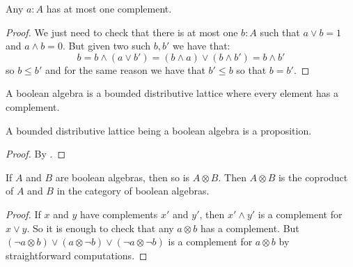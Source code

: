 \begin{lemma}\label{complement-unique}
Any $a:A$ has at most one complement.
\end{lemma}

\begin{proof}
We just need to check that there is at most one $b:A$ such that $a\lor b=1$ and $a\land b = 0$. But given two such $b,b'$ we have that:
\[b = b\land (a\lor b') = (b\land a) \lor (b\land b') = b\land b'\]
so $b\leq b'$ and for the same reason we have that $b'\leq b$ so that $b=b'$.
\end{proof}

\begin{definition}
A boolean algebra is a bounded distributive lattice where every element has a complement.
\end{definition}

\begin{lemma}\label{being-boolean-proposition}
A bounded distributive lattice being a boolean algebra is a proposition.
\end{lemma}

\begin{proof}
By .
\end{proof}

\begin{lemma}
If $A$ and $B$ are boolean algebras, then so is $A\otimes B$. Then $A\otimes B$ is the coproduct of $A$ and $B$ in the category of boolean algebras.
\end{lemma}

\begin{proof}
If $x$ and $y$ have complements $x'$ and $y'$, then $x'\land y'$ is a complement for $x\lor y$. So it is enough to check that any $a\otimes b$ has a complement. But $(\neg a\otimes b) \lor (a\otimes \neg b) \lor (\neg a\otimes \neg b)$ is a complement for $a\otimes b$ by straightforward computations.
\end{proof}
